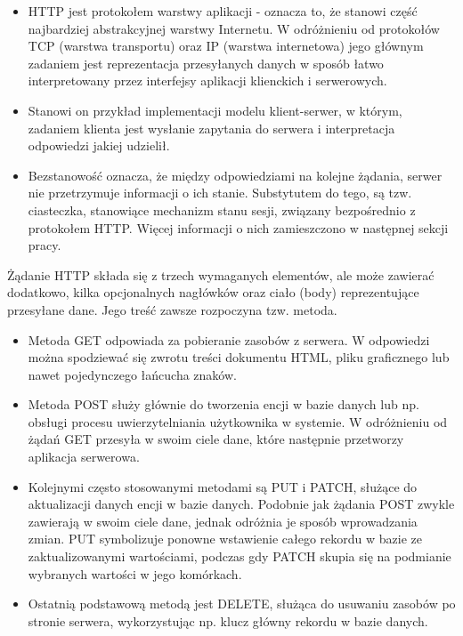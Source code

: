 \begin{itemize}
    \item HTTP jest protokołem warstwy aplikacji - oznacza to, że stanowi część najbardziej abstrakcyjnej warstwy Internetu. W odróżnieniu od protokołów TCP (warstwa transportu) oraz IP (warstwa internetowa) jego głównym zadaniem jest reprezentacja przesyłanych danych w sposób łatwo interpretowany przez interfejsy aplikacji klienckich i serwerowych.
    \item Stanowi on przykład implementacji modelu klient-serwer, w którym, zadaniem klienta jest wysłanie zapytania do serwera i interpretacja odpowiedzi jakiej udzielił.
    \item Bezstanowość oznacza, że między odpowiedziami na kolejne żądania, serwer nie przetrzymuje informacji o ich stanie. Substytutem do tego, są tzw. ciasteczka, stanowiące mechanizm stanu sesji, związany bezpośrednio z protokołem HTTP. Więcej informacji o nich zamieszczono w następnej sekcji pracy.
\end{itemize}

Żądanie HTTP składa się z trzech wymaganych elementów, ale może zawierać dodatkowo, kilka opcjonalnych nagłówków oraz ciało (body) reprezentujące przesyłane dane. Jego treść zawsze rozpoczyna tzw. metoda.

\begin{itemize}
    \item Metoda GET odpowiada za pobieranie zasobów z serwera. W odpowiedzi można spodziewać się zwrotu treści dokumentu HTML, pliku graficznego lub nawet pojedynczego łańcucha znaków.
    \item Metoda POST służy głównie do tworzenia encji w bazie danych lub np. obsługi procesu uwierzytelniania użytkownika w systemie. W odróżnieniu od żądań GET przesyła w swoim ciele dane, które następnie przetworzy aplikacja serwerowa.
    \item Kolejnymi często stosowanymi metodami są PUT i PATCH, służące do aktualizacji danych encji w bazie danych. Podobnie jak żądania POST zwykle zawierają w swoim ciele dane, jednak odróżnia je sposób wprowadzania zmian. PUT symbolizuje ponowne wstawienie całego rekordu w bazie ze zaktualizowanymi wartościami, podczas gdy PATCH skupia się na podmianie wybranych wartości w jego komórkach.
    \item Ostatnią podstawową metodą jest DELETE, służąca do usuwaniu zasobów po stronie serwera, wykorzystując np. klucz główny rekordu w bazie danych.
\end{itemize}

